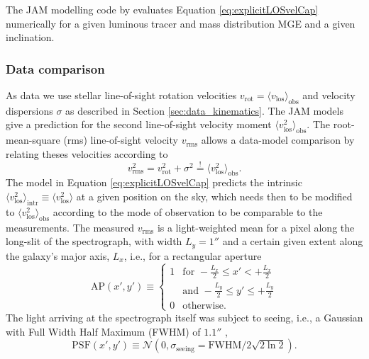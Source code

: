 \documentclass[useAMS,usenatbib]{mnras}
\begin{document}
The JAM modelling code by \citet{Cap08} evaluates Equation \eqref{eq:explicitLOSvelCap} numerically for a given luminous tracer and mass distribution MGE and a given inclination.

\subsubsection{Data comparison} \label{sec:model_JAM_compare}

As data we use stellar line-of-sight rotation velocities $v_\text{rot} = \langle v_\text{los} \rangle_\text{obs}$ and velocity dispersions $\sigma$ as described in Section \ref{sec:data_kinematics}. The JAM models give a prediction for the second line-of-sight velocity moment $\langle v_\text{los}^2 \rangle_\text{obs}$. The root-mean-square (rms) line-of-sight velocity $v_\text{rms}$ allows a data-model comparison by relating theses velocities according to 
\begin{equation*}
 v_\text{rms}^2 = v_\text{rot}^2 + \sigma^2  \stackrel{!}{=} \langle v_\text{los}^2 \rangle_\text{obs}.
\end{equation*}
The model in Equation \eqref{eq:explicitLOSvelCap} predicts the intrinsic $\langle v_\text{los}^2 \rangle_\text{intr}\equiv\langle v_\text{los}^2\rangle$ at a given position on the sky, which needs then to be modified to $\langle v_\text{los}^2 \rangle_\text{obs}$ according to the mode of observation to be comparable to the measurements. The measured $v_\text{rms}$ is a light-weighted mean for a pixel along the long-slit of the spectrograph, with width $L_y = 1''$ \citep{SWELLSV} and a certain given extent along the galaxy's major axis, $L_x$, i.e., for a rectangular aperture
\begin{equation*}
\text{AP}(x',y') \equiv \left\{ \begin{array}{ll} 1 & \text{for } -\frac{L_x}{2} \leq x' < + \frac{L_x}{2}\\
& \text{and } - \frac{L_y}{2} \leq y' \leq + \frac{L_y}{2}  \\ 0 & \text{otherwise.} \end{array} \right.
\end{equation*}
The light arriving at the spectrograph itself was subject to seeing, i.e., a Gaussian with Full Width Half Maximum (FWHM) of $1.1''$ \citep{SWELLSV},
\begin{equation*}
\text{PSF}(x',y')\equiv\mathscr{N}(0,\sigma_\text{seeing}=\text{FWHM}/2\sqrt{2\ln2}).
\end{equation*}
\end{document}
